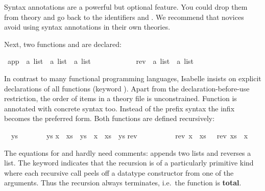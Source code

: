 \begin{isabellebody}
\begin{isamarkuptext}
\begin{warn}
  Syntax annotations are a powerful but optional feature. You
  could drop them from theory  and go back to the identifiers
   and .
  We recommend that novices avoid using
  syntax annotations in their own theories.
\end{warn}
Next, two functions  and  are declared:%
\end{isamarkuptext}%
\ app\ {\isacharcolon}{\isacharcolon}\ {\isachardoublequote}{\isacharprime}a\ list\ {\isasymRightarrow}\ {\isacharprime}a\ list\ {\isasymRightarrow}\ {\isacharprime}a\ list{\isachardoublequote}\ \ \ {\isacharparenleft}\ {\isachardoublequote}{\isacharat}{\isachardoublequote}\ {}{}{\isacharparenright}\isanewline
\ \ \ \ \ \ \ rev\ {\isacharcolon}{\isacharcolon}\ {\isachardoublequote}{\isacharprime}a\ list\ {\isasymRightarrow}\ {\isacharprime}a\ list{\isachardoublequote}%
\begin{isamarkuptext}%
\noindent
In contrast to many functional programming languages,
Isabelle insists on explicit declarations of all functions
(keyword ).  Apart from the declaration-before-use
restriction, the order of items in a theory file is unconstrained. Function
 is annotated with concrete syntax too. Instead of the
prefix syntax  the infix
 becomes the preferred
form. Both functions are defined recursively:%
\end{isamarkuptext}%
\isanewline
{\isachardoublequote}{\isacharbrackleft}{\isacharbrackright}\ {\isacharat}\ ys\ \ \ \ \ \ \ {\isacharequal}\ ys{\isachardoublequote}\isanewline
{\isachardoublequote}{\isacharparenleft}x\ {\isacharhash}\ xs{\isacharparenright}\ {\isacharat}\ ys\ {\isacharequal}\ x\ {\isacharhash}\ {\isacharparenleft}xs\ {\isacharat}\ ys{\isacharparenright}{\isachardoublequote}\isanewline
\isanewline
{}\isanewline
{\isachardoublequote}rev\ {\isacharbrackleft}{\isacharbrackright}\ \ \ \ \ \ \ \ {\isacharequal}\ {\isacharbrackleft}{\isacharbrackright}{\isachardoublequote}\isanewline
{\isachardoublequote}rev\ {\isacharparenleft}x\ {\isacharhash}\ xs{\isacharparenright}\ \ {\isacharequal}\ {\isacharparenleft}rev\ xs{\isacharparenright}\ {\isacharat}\ {\isacharparenleft}x\ {\isacharhash}\ {\isacharbrackleft}{\isacharbrackright}{\isacharparenright}{\isachardoublequote}%
\begin{isamarkuptext}%
\noindent
The equations for  and  hardly need comments:
 appends two lists and  reverses a list.  The
keyword  indicates that the recursion is
of a particularly primitive kind where each recursive call peels off a datatype
constructor from one of the arguments.  Thus the
recursion always terminates, i.e.\ the function is \textbf{total}.


\end{isamarkuptext}
\end{isabellebody}
